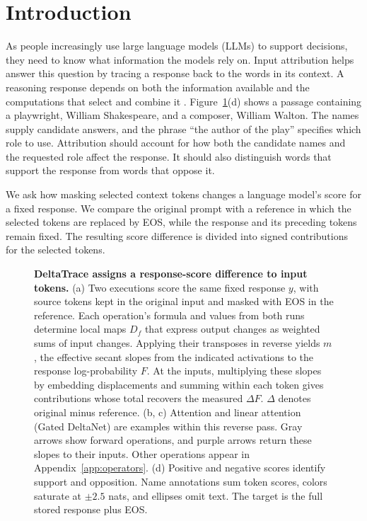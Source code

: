 \section{Introduction}
\label{sec:introduction}


As people increasingly use large language models (LLMs) to support decisions, they need to know what information the models rely on. Input attribution helps answer this question by tracing a response back to the words in its context. A reasoning response depends on both the information available and the computations that select and combine it \citep{ferrando2024information}. Figure~\ref{fig:overview}(d) shows a passage containing a playwright, William Shakespeare, and a composer, William Walton. The names supply candidate answers, and the phrase ``the author of the play'' specifies which role to use. Attribution should account for how both the candidate names and the requested role affect the response. It should also distinguish words that support the response from words that oppose it.

We ask how masking selected context tokens changes a language model's score for a fixed response. We compare the original prompt with a reference in which the selected tokens are replaced by EOS, while the response and its preceding tokens remain fixed. The resulting score difference is divided into signed contributions for the selected tokens.

\begin{figure}[t]
\centering

\caption{\textbf{DeltaTrace assigns a response-score difference to input tokens.} (a) Two executions score the same fixed response $y$, with source tokens kept in the original input and masked with EOS in the reference. Each operation's formula and values from both runs determine local maps $D_f$ that express output changes as weighted sums of input changes. Applying their transposes in reverse yields $m$, the effective secant slopes from the indicated activations to the response log-probability $F$. At the inputs, multiplying these slopes by embedding displacements and summing within each token gives contributions whose total recovers the measured $\Delta F$. $\Delta$ denotes original minus reference. (b, c) Attention and linear attention (Gated DeltaNet) are examples within this reverse pass. Gray arrows show forward operations, and purple arrows return these slopes to their inputs. Other operations appear in Appendix~\ref{app:operators}. (d) Positive and negative scores identify support and opposition. Name annotations sum token scores, colors saturate at $\pm2.5$ nats, and ellipses omit text. The target is the full stored response plus EOS.}
\label{fig:overview}
\end{figure}

